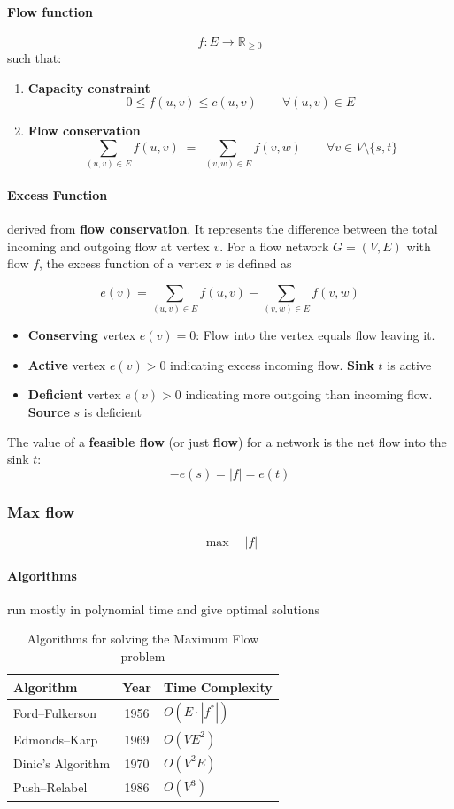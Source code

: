 \paragraph{Flow function}
\[
f : E \to \mathbb{R}_{\ge 0}
\]
such that:

\begin{enumerate}
    \item \textbf{Capacity constraint}
    \[
    0 \le f(u,v) \le c(u,v)
    \qquad \forall (u,v)\in E
    \]

    \item \textbf{Flow conservation}
    \[
    \sum_{(u,v)\in E} f(u,v)
    \;=\;
    \sum_{(v,w)\in E} f(v,w)
    \qquad \forall v \in V \setminus \{s,t\}
    \]
\end{enumerate}
\paragraph{Excess Function} derived from \textbf{flow conservation}. It represents the difference between the total incoming and outgoing flow at vertex \(v\). For a flow network \(G = (V,E)\) with flow \(f\), the excess function of a vertex \(v\) is defined as

\[
e(v) =
\sum_{(u,v)\in E} f(u,v)
-
\sum_{(v,w)\in E} f(v,w)
\]



\begin{itemize}

\item \textbf{Conserving} vertex \(e(v) = 0\): Flow into the vertex equals flow leaving it.
\item \textbf{Active} vertex \(e(v) > 0\) indicating excess incoming flow. \textbf{Sink} \(t\) is active
\item \textbf{Deficient} vertex \(e(v) > 0\) indicating more outgoing than incoming flow. \textbf{Source} \(s\) is deficient


\end{itemize}
The value of a \textbf{feasible flow} (or just \textbf{flow}) for a network is the net flow into the sink \(t\):
\[
-e(s) = |f| = e(t)
\]
\subsubsection{Max flow}
\[
\max \quad |f|
\]
\paragraph{Algorithms} run mostly in polynomial time and give optimal solutions
\begin{table}[h]
\centering
\begin{tabular}{|l|c|l|}
\hline
\textbf{Algorithm} & \textbf{Year} & \textbf{Time Complexity} \\
\hline
Ford--Fulkerson & 1956 & $O(E \cdot |f^*|)$ \\
Edmonds--Karp & 1969 & $O(VE^2)$ \\
Dinic's Algorithm & 1970 & $O(V^2E)$ \\
Push--Relabel & 1986 & $O(V^3)$ \\
\hline
\end{tabular}
\caption{Algorithms for solving the Maximum Flow problem}
\end{table}
